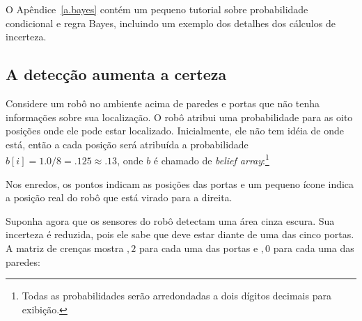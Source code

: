 O Apêndice~\ref{a.bayes} contém um pequeno tutorial sobre probabilidade condicional e regra Bayes, incluindo um exemplo dos detalhes dos cálculos de incerteza.

\subsection{A detecção aumenta a certeza}

Considere um robô no ambiente acima de paredes e portas que não tenha informações sobre sua localização. O robô atribui uma probabilidade para as oito posições onde ele pode estar localizado. Inicialmente, ele não tem idéia de onde está, então a cada posição será atribuída a probabilidade $b[i]=1.0/8=.125\approx .13$, onde $b$ é chamado de \emph{belief array}:\footnote{Todas as probabilidades serão arredondadas a dois dígitos decimais para exibição.}
\begin{center}
\end{center}

Nos enredos, os pontos indicam as posições das portas e um pequeno ícone indica a posição real do robô que está virado para a direita.

Suponha agora que os sensores do robô detectam uma área cinza escura. Sua incerteza é reduzida, pois ele sabe que deve estar diante de uma das cinco portas. A matriz de crenças mostra $,2$ para cada uma das portas e $,0$ para cada uma das paredes:
\begin{center}
\end{center}

